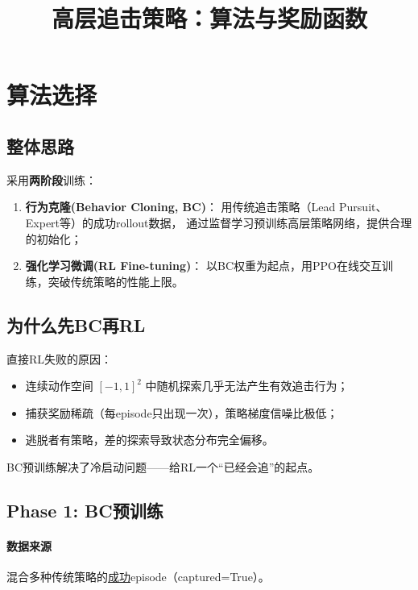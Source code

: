 \documentclass[11pt]{article}
\title{高层追击策略：算法与奖励函数}
\author{}
\date{}
\begin{document}
\maketitle

\section{算法选择}

\subsection{整体思路}

采用\textbf{两阶段}训练：
\begin{enumerate}
  \item \textbf{行为克隆(Behavior Cloning, BC)}：
        用传统追击策略（Lead Pursuit、Expert等）的成功rollout数据，
        通过监督学习预训练高层策略网络，提供合理的初始化；
  \item \textbf{强化学习微调(RL Fine-tuning)}：
        以BC权重为起点，用PPO在线交互训练，突破传统策略的性能上限。
\end{enumerate}

\subsection{为什么先BC再RL}

直接RL失败的原因：
\begin{itemize}
  \item 连续动作空间 $[-1,1]^2$ 中随机探索几乎无法产生有效追击行为；
  \item 捕获奖励稀疏（每episode只出现一次），策略梯度信噪比极低；
  \item 逃脱者有策略，差的探索导致状态分布完全偏移。
\end{itemize}
BC预训练解决了冷启动问题——给RL一个``已经会追''的起点。

\subsection{Phase 1: BC预训练}

\paragraph{数据来源} 混合多种传统策略的\underline{成功}episode（captured=True）。
\end{document}
